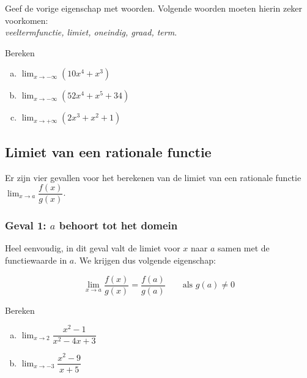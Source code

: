 \documentclass[12pt]{article}
\newenvironment{eigenschap}
{
  \vspace{0.4cm}
  \begin{mdframed}[nobreak=true,frametitle={Eigenschap}]
  }{%
  \end{mdframed}
}
\begin{document}
\begin{oefening}
  Geef de vorige eigenschap met woorden. Volgende woorden moeten hierin zeker voorkomen:\\
  {\em veeltermfunctie, limiet, oneindig, graad, term}.
\end{oefening}

\begin{oefening}
  Bereken
  \begin{enumerate}[(a)]
  \itemsep.5em
  \item $\displaystyle\lim_{x\to-\infty}\left(10x^4+x^3\right)$
  \item $\displaystyle\lim_{x\to-\infty}\left(52x^4+x^5+34\right)$
  \item $\displaystyle\lim_{x\to+\infty}\left(2x^3+x^2+1\right)$
  \end{enumerate}
\end{oefening}

\begin{theorie}

\subsection{Limiet van een rationale functie}

Er zijn vier gevallen voor het berekenen van de limiet van een rationale functie $\displaystyle\lim_{x\to a}\dfrac{f(x)}{g(x)}$.

\subsubsection*{Geval 1: $a$ behoort tot het domein}

Heel eenvoudig, in dit geval valt de limiet voor $x$ naar $a$ samen met de functiewaarde in $a$. We krijgen dus volgende eigenschap:

\begin{eigenschap}
  $$\lim_{x\to a}\dfrac{f(x)}{g(x)}=\dfrac{f(a)}{g(a)} \qquad \mbox{als $g(a)\neq 0$}$$
\end{eigenschap}

\end{theorie}

\begin{oefening}
  Bereken
  \begin{enumerate}[(a)]
  \itemsep.5em
  \item $\displaystyle\lim_{x\to2}\dfrac{x^2-1}{x^2-4x+3}$
  \item $\displaystyle\lim_{x\to-3}\dfrac{x^2-9}{x+5}$
  \end{enumerate}
\end{oefening}
\end{document}
